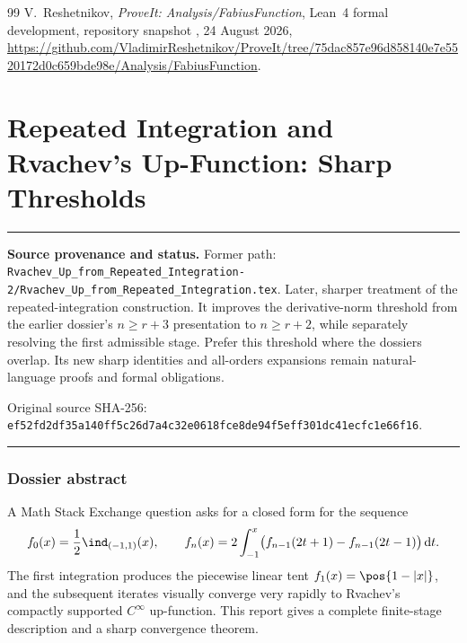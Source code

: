 \documentclass[11pt,oneside]{article}
\theoremstyle{definition}
\theoremstyle{remark}
\newcommand{\dd}{\,\mathrm d}
\newenvironment{boxedremark}{%
  \par\smallskip\noindent\begin{center}\begin{minipage}{0.94\textwidth}%
  \color{black}\hrule\vspace{0.6em}\small
}{%
  \vspace{0.6em}\hrule\end{minipage}\end{center}\smallskip
}
\begin{document}
\begin{thebibliography}{99}
V.~Reshetnikov,
\newblock \emph{ProveIt: Analysis/FabiusFunction},
\newblock Lean~4 formal development, repository snapshot
  , 24 August 2026,
\newblock \url{https://github.com/VladimirReshetnikov/ProveIt/tree/75dac857e96d858140e7e5520172d0c659bde98e/Analysis/FabiusFunction}.

\end{thebibliography}


\renewcommand{\arraystretch}{1}

\clearpage
\part{Repeated Integration and Rvachev's Up-Function: Sharp Thresholds}
\label{part:repeated2}
\begin{boxedremark}
\textbf{Source provenance and status.} Former path: \nolinkurl{Rvachev_Up_from_Repeated_Integration-2/Rvachev_Up_from_Repeated_Integration.tex}.  Later, sharper treatment of the repeated-integration construction.  It improves the derivative-norm threshold from the earlier dossier's \(n\ge r+3\) presentation to \(n\ge r+2\), while separately resolving the first admissible stage.  Prefer this threshold where the dossiers overlap.  Its new sharp identities and all-orders expansions remain natural-language proofs and formal obligations.\par\smallskip Original source SHA-256: \nolinkurl{ef52fd2df35a140ff5c26d7a4c32e0618fce8de94f5eff301dc41ecfc1e66f16}.
\end{boxedremark}
\section*{Dossier abstract}
A Math Stack Exchange question asks for a closed form for the sequence
\[
 f_0(x)=\frac12\ind_{(-1,1)}(x),\qquad
 f_n(x)=2\int_{-1}^{x}\bigl(f_{n-1}(2t+1)-f_{n-1}(2t-1)\bigr)\dd t.
\]
The first integration produces the piecewise linear tent
$f_1(x)=\pos{1-|x|}$, and the subsequent iterates visually converge very rapidly to
Rvachev's compactly supported $C^\infty$ up-function.  This report gives a complete
finite-stage description and a sharp convergence theorem.
\end{document}
